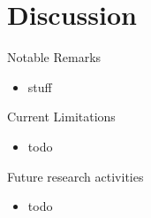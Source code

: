 \documentclass[presentation]{beamer}\mode<presentation>{\usetheme{AMSBolognaFC}}
\begin{document}
\section{Discussion}

\begin{frame}{Notable Remarks}
    \begin{itemize}
        \item stuff
    \end{itemize}
\end{frame}

\begin{frame}{Current Limitations}
    \begin{itemize}
        \item todo
    \end{itemize}
\end{frame}

\begin{frame}{Future research activities}
    \begin{itemize}
        \item todo
    \end{itemize}
\end{frame}

\section*{}

\frame{\titlepage}

\section*{\refname}

\begin{frame}{\refname}
    \scriptsize
    
    
\end{frame}

\end{document}
